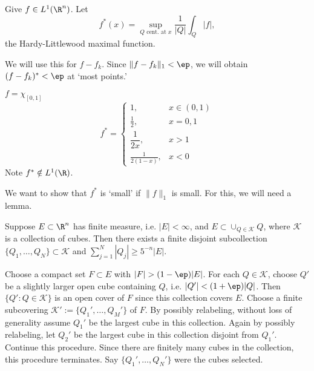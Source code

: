 \begin{dfn}
Give $f \in L^1(\R^n)$. Let 
	\[
	f^*(x)= \sup_{Q \text{ cent. at } x} \dfrac{1}{|Q|} \int_Q |f|,
	\]
the Hardy-Littlewood maximal function.
\end{dfn}


We will use this for $f - f_k$. Since $\| f - f_k \|_1 < \ep$, we will obtain $(f-f_k)^*<\ep$ at `most points.' 

\begin{ex}
$f= \chi_{[0,1]}$
	\[
	f^*= \begin{cases}
	1, & x \in (0,1) \\
	\frac{1}{2}, & x=0,1 \\
	\dfrac{1}{2x}, & x>1 \\
	\frac{1}{2(1-x)}, &  x<0
	\end{cases}
	\]
Note $f^* \notin L^1(\R)$.

\end{ex}















We want to show that $f^*$ is `small' if $\| f \|_1$ is small. For this, we will need a lemma.


\begin{lem}
Suppose $E \subset \R^n$ has finite measure, i.e. $|E|<\infty$, and $E \subset \cup_{Q \in \mathcal{K}} Q$, where $\mathcal{K}$ is a collection of cubes. Then there exists a finite disjoint subcollection $\{Q_1,\ldots,Q_N\} \subset \mathcal{K}$ and $\sum_{j=1}^N |Q_j| \geq 5^{-n} |E|$. 
\end{lem}

\pf Choose a compact set $F \subset E$ with $|F| > (1-\ep) |E|$. For each $Q \in \mathcal{K}$, choose $Q'$ be a slightly larger open cube containing $Q$, i.e. $|Q'| < (1+\ep) |Q|$. Then $\{ Q' \colon Q \in \mathcal{K} \}$ is an open cover of $F$ since this collection covers $E$. Choose a finite subcovering $\mathcal{K}':= \{Q_1',\ldots, Q_M' \}$ of $F$. By possibly relabeling, without loss of generality assume $Q_1'$ be the largest cube in this collection. Again by possibly relabeling, let $Q_2'$ be the largest cube in this collection disjoint from $Q_1'$. Continue this procedure. Since there are finitely many cubes in the collection, this procedure terminates. Say $\{Q_1', \ldots, Q_N' \}$ were the cubes selected. 

